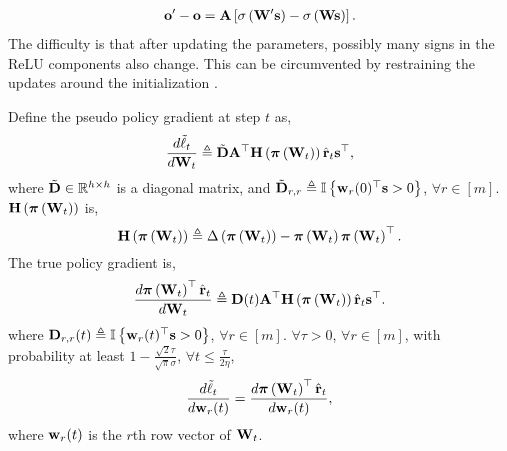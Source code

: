 \begin{equation*}
\begin{split}
    {\mathbf{o}}^\prime - {\mathbf{o}} = {\mathbf{A}} \left[ \sigma \left( {\mathbf{W}}^\prime {\mathbf{s}} \right) - \sigma \left( {\mathbf{W}} {\mathbf{s}} \right) \right].
\end{split}
\end{equation*}
The difficulty is that after updating the parameters, possibly many signs in the ReLU components also change. This can be circumvented by restraining the updates around the initialization \citep{li2018learning}.

\begin{lem}
\label{lem:gradient_coupling}
	Define the pseudo policy gradient at step $t$ as,
\begin{equation*}
\begin{split}
	\frac{d \tilde{\ell}_t}{d {\mathbf{W}}_t} \triangleq \tilde{{\mathbf{D}}} {\mathbf{A}}^\top {\mathbf{H}}\left( {\boldsymbol{\pi}}\left({\mathbf{W}}_t\right) \right) \hat{{\mathbf{r}}}_t {\mathbf{s}}^\top,
\end{split}
\end{equation*}
where $\tilde{{\mathbf{D}}} \in {\mathbb{R}}^{h \times h}$ is a diagonal matrix, and  $\tilde{{\mathbf{D}}}_{r,r} \triangleq {\mathbb{I}}\left\{ {\mathbf{w}}_r(0)^\top {\mathbf{s}} > 0 \right\}$, $\forall r \in [m]$. ${\mathbf{H}}\left( {\boldsymbol{\pi}}\left({\mathbf{W}}_t\right) \right)$ is,
\begin{equation*}
    {\mathbf{H}}\left( {\boldsymbol{\pi}}\left({\mathbf{W}}_t\right) \right) \triangleq \Delta\left( {\boldsymbol{\pi}}\left({\mathbf{W}}_t\right) \right) - {\boldsymbol{\pi}}\left({\mathbf{W}}_t\right) {\boldsymbol{\pi}}\left({\mathbf{W}}_t\right)^\top.
\end{equation*}
The true policy gradient is,
\begin{equation*}
\begin{split}
    \frac{d {\boldsymbol{\pi}}\left({\mathbf{W}}_t\right)^\top \hat{{\mathbf{r}}}_t}{d {\mathbf{W}}_t} \triangleq  {\mathbf{D}}(t) {\mathbf{A}}^\top {\mathbf{H}}\left( {\boldsymbol{\pi}}\left({\mathbf{W}}_t\right) \right) \hat{{\mathbf{r}}}_t {\mathbf{s}}^\top.
\end{split}
\end{equation*}
where ${\mathbf{D}}_{r,r}(t) \triangleq {\mathbb{I}}\left\{ {\mathbf{w}}_r(t)^\top {\mathbf{s}} > 0 \right\}$, $\forall r \in [m]$. $\forall \tau > 0$, $\forall r \in [m]$, with probability at least $1 - \frac{\sqrt{2}\tau}{\sqrt{\pi}\sigma}$, $\forall t \le \frac{\tau}{ 2 \eta }$,
\begin{equation*}
	\frac{d\tilde{\ell}_t}{d {\mathbf{w}}_r(t)} = \frac{d {\boldsymbol{\pi}}\left({\mathbf{W}}_t\right)^\top \hat{{\mathbf{r}}}_t}{d {\mathbf{w}}_r(t)},
\end{equation*}
where ${\mathbf{w}}_r(t)$ is the $r$th row vector of ${\mathbf{W}}_t$.
\end{lem}

